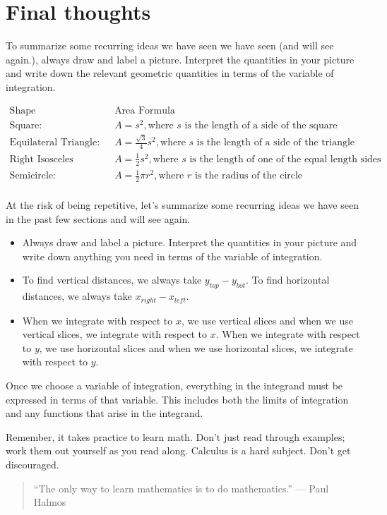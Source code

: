 \documentclass{ximera}
\begin{document}
\section{Final thoughts}
To summarize some recurring ideas we have seen we have seen (and will see again.), always draw and label a picture.  Interpret the quantities in your picture and write down the relevant geometric quantities in terms of the variable of integration.

\[
\begin{array}{ll}
\textrm{Shape} & \textrm{Area Formula} \\ [2ex]
\textrm{Square:} & A=s^2, \textrm{where } s \textrm{ is the length of a side of the square} \\  [2ex]
\textrm{Equilateral Triangle:} & A=\frac{\sqrt{3}}{4} s^2, \textrm{where } s \textrm{ is the length of a side of the triangle} \\  [2ex]
\textrm{Right Isosceles Triangle:} & A=\frac{1}{2} s^2, \textrm{where } s \textrm{ is the length of one of the equal length sides} \\  [2ex]
\textrm{Semicircle:} & A=\frac{1}{2} \pi r^2, \textrm{where } r \textrm{ is the radius of the circle} \\ [2ex]
\end{array}
\]



At the risk of being repetitive, let's summarize some recurring ideas we have seen in the past few sections and will see again.  

\begin{itemize}
\item Always draw and label a picture.  Interpret the quantities in your picture and write down anything you need in terms of the variable of integration.

\item To find vertical distances, we always take $y_{top} - y_{bot}$.  To find horizontal distances, we always take $x_{right}-x_{left}$.

\item When we integrate with respect to $x$, we use vertical slices and when we use vertical slices, we integrate with respect to $x$. When we integrate with respect to $y$, we use horizontal slices and when we use horizontal slices, we integrate with respect to $y$.
\end{itemize}

\begin{fact}
Once we choose a variable of integration, everything in the integrand must be expressed in terms of that variable.  This includes both the limits of integration and any functions that arise in the integrand.
\end{fact}

Remember, it takes practice to learn math.  Don't just read through examples; work them out yourself as you read along. Calculus is a hard subject. Don't get discouraged.


\begin{quote}
``The only way to learn mathematics is to do mathematics.'' --- Paul Halmos
\end{quote}
\end{document}
